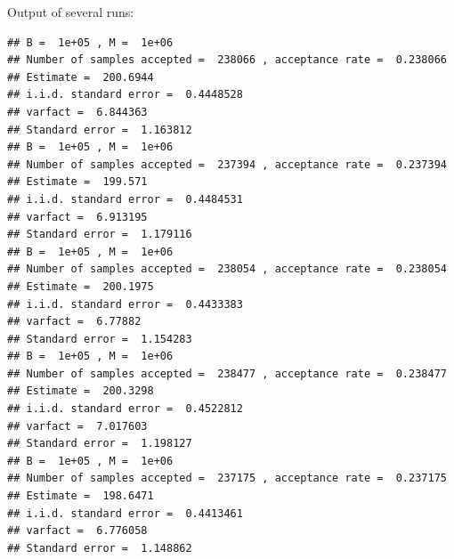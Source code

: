 \begin{knitrout}
\begin{kframe}
\begin{alltt}
 \hlkwb{=} \hlstd{(fnlist[(B}\hlopt{+}\hlstd{)}\hlopt{:}\hlopt{+}\hlstd{B)])}
 \hlkwb{=} \hlstd{(fnlist[(B}\hlopt{+}\hlstd{)}\hlopt{:}\hlopt{+}\hlstd{B)])}\hlopt{/}
 \hlkwb{=} \hlstd{(fnlist[(B}\hlopt{+}\hlstd{)}\hlopt{:}\hlopt{+}\hlstd{B)],} \hlstd{=} \hlstd{,} \hlstd{=} \hlstd{)}\hlopt{$}
 \hlkwb{=} \hlopt{*}\hlstd{(acf_k[}\hlopt{:}\hlstd{(}\hlopt{<}\hlstd{))])}\hlopt{-}
 \hlkwb{=} \hlopt{*}
 \hlkwb{=} \hlopt{/}

\hlstd{(}\hlstd{)}
\hlstd{(}\hlstd{)}
\hlstd{(}\hlstd{)}
\hlstd{(}\hlstd{)}
\hlstd{(}\hlstd{)}
\hlstd{(}\hlstd{)}
\end{alltt}
\end{kframe}
\end{knitrout}
Output of several runs:
\begin{knitrout}
\color{fgcolor}\begin{kframe}
\begin{verbatim}
## B =  1e+05 , M =  1e+06 
## Number of samples accepted =  238066 , acceptance rate =  0.238066 
## Estimate =  200.6944 
## i.i.d. standard error =  0.4448528 
## varfact =  6.844363 
## Standard error =  1.163812
## B =  1e+05 , M =  1e+06 
## Number of samples accepted =  237394 , acceptance rate =  0.237394 
## Estimate =  199.571 
## i.i.d. standard error =  0.4484531 
## varfact =  6.913195 
## Standard error =  1.179116
## B =  1e+05 , M =  1e+06 
## Number of samples accepted =  238054 , acceptance rate =  0.238054 
## Estimate =  200.1975 
## i.i.d. standard error =  0.4433383 
## varfact =  6.77882 
## Standard error =  1.154283
## B =  1e+05 , M =  1e+06 
## Number of samples accepted =  238477 , acceptance rate =  0.238477 
## Estimate =  200.3298 
## i.i.d. standard error =  0.4522812 
## varfact =  7.017603 
## Standard error =  1.198127
## B =  1e+05 , M =  1e+06 
## Number of samples accepted =  237175 , acceptance rate =  0.237175 
## Estimate =  198.6471 
## i.i.d. standard error =  0.4413461 
## varfact =  6.776058 
## Standard error =  1.148862
\end{verbatim}
\end{kframe}
\end{knitrout}
